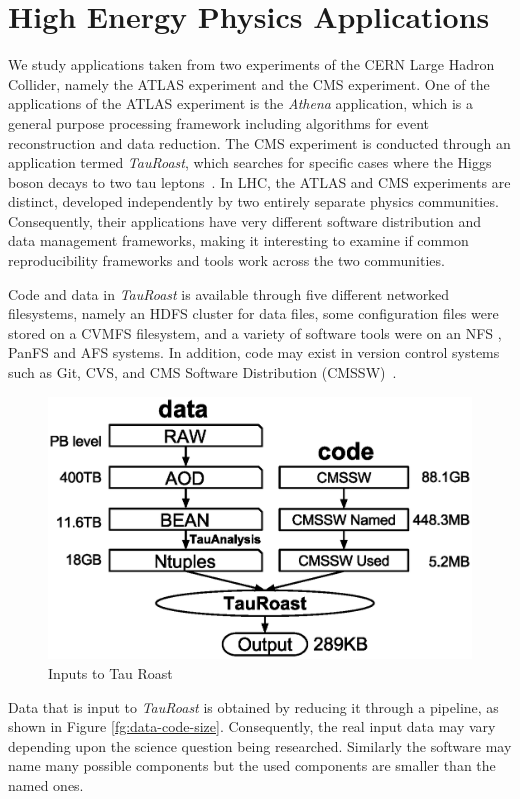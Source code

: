 


\section{High Energy Physics Applications}

We study applications taken from two experiments of the CERN Large Hadron Collider, namely the ATLAS experiment and the CMS experiment. 
One of the applications of the ATLAS experiment is the \emph{Athena} application, which is a general purpose processing framework including algorithms
for event reconstruction and data reduction. The CMS experiment is conducted through an application termed  \emph{TauRoast}, which searches for specific 
cases where the Higgs boson decays to two tau leptons~\cite{chatrchyan2013search}. In LHC, the ATLAS and CMS experiments are distinct, 
developed independently by two entirely separate physics communities. Consequently, their applications  
have very different software distribution and data management frameworks, making it interesting to examine if common reproducibility frameworks and 
tools work across the two communities. 



Code and data in \emph{TauRoast} is available through five different networked filesystems, namely an HDFS \cite{} cluster for data files, 
some configuration files were stored on a CVMFS \cite{} filesystem, and a variety of software tools were on an NFS \cite{}, PanFS\cite{} and AFS \cite{} systems.
In addition, code may exist in version control systems such as Git, CVS, and CMS Software Distribution (CMSSW)~\cite{cms2006cms}. 
\begin{figure}
\small
\centering
\includegraphics[width=.48\textwidth]{data-code-size.eps}
\caption{Inputs to Tau Roast}
\label{fig:data-code-size}
\end{figure}
Data that is input to \emph{TauRoast} is obtained by reducing it through a pipeline, as shown in Figure \ref{fg:data-code-size}. Consequently, the real input data may 
vary depending upon the science question being researched. Similarly the software may name many possible components but the used components are
smaller than the named ones. 

